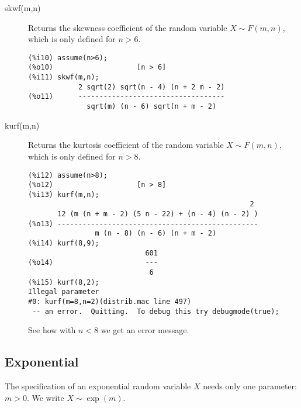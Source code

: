 \documentclass[12pt,a4paper]{article}
\begin{document}
\begin{description}
\item[skwf(m,n)] Returns the skewness coefficient of the random variable $X \sim F(m,n)$, which is only defined for $n>6$.

\begin{verbatim}
(%i10) assume(n>6);
(%o10)                    [n > 6]
(%i11) skwf(m,n);
            2 sqrt(2) sqrt(n - 4) (n + 2 m - 2)
(%o11)      -----------------------------------
              sqrt(m) (n - 6) sqrt(n + m - 2)
\end{verbatim}

\item[kurf(m,n)] Returns the kurtosis coefficient of the random variable $X \sim F(m,n)$, which is only defined for $n>8$.

\begin{verbatim}
(%i12) assume(n>8);
(%o12)                    [n > 8]
(%i13) kurf(m,n);
                                                     2
       12 (m (n + m - 2) (5 n - 22) + (n - 4) (n - 2) )
(%o13) ------------------------------------------------
                m (n - 8) (n - 6) (n + m - 2)
(%i14) kurf(8,9);
                            601
(%o14)                      ---
                             6
(%i15) kurf(8,2);
Illegal parameter
#0: kurf(m=8,n=2)(distrib.mac line 497)
 -- an error.  Quitting.  To debug this try debugmode(true);
\end{verbatim}
See how with $n<8$ we get an error message.

\end{description}


\subsection{Exponential}

The specification of an exponential random variable $X$ needs only one parameter: $m > 0$. We write $X \sim \exp(m)$.
\end{document}

